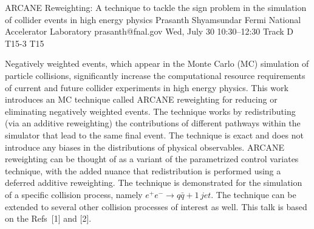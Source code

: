 \begin{talk}
  {ARCANE Reweighting: A technique to tackle the sign problem in the simulation of collider events in high energy physics}%
  {Prasanth Shyamsundar}%
  {Fermi National Accelerator Laboratory}%
  {prasanth@fnal.gov}%
  {}%
  {}%
  {Wed, July 30 10:30–12:30 Track D}%
  {T15-3}%
  {T15}%
  {}%
  
				
			

Negatively weighted events, which appear in the Monte Carlo (MC) simulation of particle collisions, significantly increase the computational resource requirements of current and future collider experiments in high energy physics. This work introduces an MC technique called ARCANE reweighting for reducing or eliminating negatively weighted events. The technique works by redistributing (via an additive reweighting) the contributions of different pathways within the simulator that lead to the same final event. The technique is exact and does not introduce any biases in the distributions of physical observables. ARCANE reweighting can be thought of as a variant of the parametrized control variates technique, with the added nuance that redistribution is performed using a deferred additive reweighting. The technique is demonstrated for the simulation of a specific collision process, namely $e^+ e^- \longrightarrow q \bar{q} + 1\,jet$. The technique can be extended to several other collision processes of interest as well. This talk is based on the Refs~[1] and [2].

\medskip


\end{talk}
